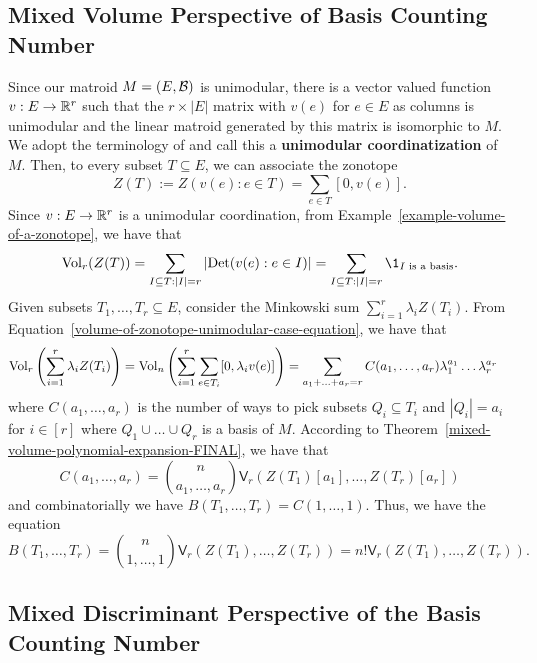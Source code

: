 \documentclass{puthesis-UG}
\begin{document}
\subsection{Mixed Volume Perspective of Basis Counting Number}

Since our matroid $M = (E, \mathcal{B})$ is unimodular, there is a vector valued function $v : E \to \mathbb{R}^r$ such that the $r \times |E|$ matrix with $v(e)$ for $e \in E$ as columns is unimodular and the linear matroid generated by this matrix is isomorphic to $M$. We adopt the terminology of \cite{STANLEY} and call this a \textbf{unimodular coordinatization} of $M$. Then, to every subset $T \subseteq E$, we can associate the zonotope
\[
	Z(T) := Z(v(e) : e \in T) = \sum_{e \in T}[0, v(e)].
\]
Since $v : E \to \mathbb{R}^r$ is a unimodular coordination, from Example~\ref{example-volume-of-a-zonotope}, we have that 
\begin{equation} \label{volume-of-zonotope-unimodular-case-equation}
	\Vol_r(Z(T)) = \sum_{I \subseteq T : |I| = r} |\text{Det}(v(e) : e \in I)| = \sum_{I \subseteq T : |I| = r} \1_{I \text{ is a basis}}. 
\end{equation}
Given subsets $T_1, \ldots, T_r \subseteq E$, consider the Minkowski sum $\sum_{i = 1}^r \lambda_i Z(T_i)$. From Equation~\ref{volume-of-zonotope-unimodular-case-equation}, we have that 
\begin{align*}
	\operatorname{Vol}_r \left ( \sum_{i = 1}^r \lambda_i Z(T_i) \right ) & = \operatorname{Vol}_n \left (\sum_{i = 1}^r \sum_{e \in T_i} [0, \lambda_i v(e)] \right ) = \sum_{a_1 + \ldots + a_r = r} C(a_1, \ldots, a_r) \lambda_1^{a_1} \ldots \lambda_r^{a_r}
\end{align*}
where $C(a_1, \ldots, a_r)$ is the number of ways to pick subsets $Q_i \subseteq T_i$ and $|Q_i| = a_i$ for $i \in [r]$ where $Q_1 \cup \ldots \cup Q_r$ is a basis of $M$. According to Theorem~\ref{mixed-volume-polynomial-expansion-FINAL}, we have that 
\[
	C(a_1, \ldots, a_r) = \binom{n}{a_1, \ldots, a_r} \mathsf{V}_r (Z(T_1)[a_1], \ldots, Z(T_r)[a_r])
\]
and combinatorially we have $B(T_1, \ldots, T_r) = C(1, \ldots, 1)$. Thus, we have the equation
\begin{equation}
	B(T_1, \ldots, T_r) = \binom{n}{1, \ldots, 1} \mathsf{V}_r(Z(T_1), \ldots, Z(T_r)) = n! \mathsf{V}_r(Z(T_1), \ldots, Z(T_r)). 
\end{equation}

\subsection{Mixed Discriminant Perspective of the Basis Counting Number}
\end{document}
